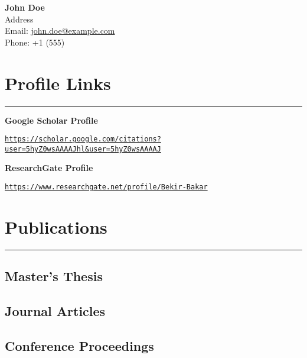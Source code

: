 \documentclass[a4paper,12pt]{article} %
\begin{document}
\noindent
\begin{minipage}[c]{0.6\textwidth}
    {\LARGE \bfseries John Doe}\\
    Address\\
    Email: \href{mailto:john.doe@example.com}{john.doe@example.com}\\
    Phone: +1 (555)
\end{minipage}

\section*{Profile Links}
\hrule\medskip

\noindent \textbf{Google Scholar Profile}
\par \smallskip
\noindent \texttt{\url{https://scholar.google.com/citations?user=5hyZ0wsAAAAJhl\&user=5hyZ0wsAAAAJ}}
\par \bigskip
\noindent \textbf{ResearchGate Profile}
\par \smallskip
\noindent \texttt{\url{https://www.researchgate.net/profile/Bekir-Bakar}}

\section*{Publications}
\hrule\medskip

\subsection*{Master's Thesis}
\begin{refsection}
    \nocite{bakar2018mastertshesis}
    \printbibliography[type=thesis,heading=none]
\end{refsection}

\subsection*{Journal Articles}
\begin{refsection}
    \nocite{yayik2022deep}
    \printbibliography[type=article,heading=none]
\end{refsection}

\subsection*{Conference Proceedings}
\begin{refsection}
    \nocite{bakar2020turkish, bakar2018experimental, bakar2018replay}
    \printbibliography[type=inproceedings,heading=none]
\end{refsection}
\end{document}
